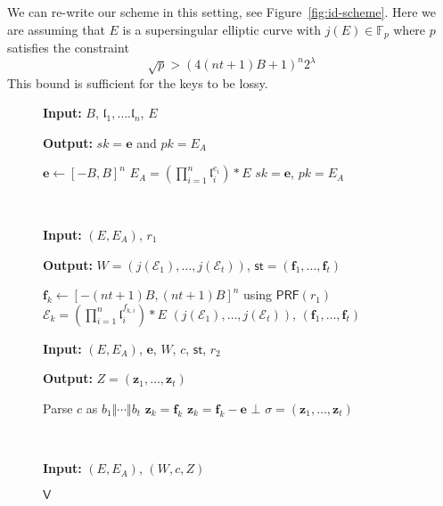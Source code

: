 \documentclass{llncs}
\newcommand{\E}{\mathcal{E}}
\newcommand{\F}{\mathbb{F}}
\renewcommand{\l}{\mathfrak{l}}
\newcommand{\e}{\mathbf{e}}
\newcommand{\f}{\mathbf{f}}
\newcommand{\z}{\mathbf{z}}
\newcommand{\IGen}{\mathsf{IGen}}
\newcommand{\PP}{\mathsf{P}}
\newcommand{\VV}{\mathsf{V}}
\newcommand{\St}{\textsf{st}}
\newcommand{\PRF}{\mathsf{PRF}}
\begin{document}
We can re-write our scheme in this setting, see Figure~\ref{fig:id-scheme}.
Here we are assuming that $E$ is a supersingular elliptic curve with $j(E) \in \F_p$ where $p$ satisfies the constraint
\begin{equation} \label{eq:lossy-p-bound}
  \sqrt{p} > (4(nt+1)B + 1)^{n} 2^\lambda
\end{equation}
This bound is sufficient for the keys to be lossy.


\begin{figure}
\begin{minipage}{.45\textwidth}
\begin{algorithm}[H]
	\caption{$\IGen$}
	\textbf{Input:} $B$, $\l_1, \dots. \l_n$, $E$

	\textbf{Output:} $sk =\e$ and $pk = E_A$

	\begin{algorithmic}[1]
		\State $\e \leftarrow [-B,B]^n$ 
		\State $E_A = ( \prod_{i=1}^n \l_i^{e_i} ) * E$
		\State \Return $sk= \e$, $pk = E_A$
	\end{algorithmic}
\end{algorithm}
\end{minipage}
 \ \ \ \ \ \ \ \ \ \ \ \ 
\begin{minipage}{0.45\textwidth}
\begin{algorithm}[H]
	\caption{$\PP_1$}
	\textbf{Input:} $(E,E_A)$,  $r_1$

	\textbf{Output:} $W = ( j(\E_1) , \dots, j(\E_t) )$, $\St = (\f_1, \dots, \f_t )$

	\begin{algorithmic}[1]
		\State $\f_k \leftarrow [-(nt+1)B,(nt+1)B]^n$ using $\PRF( r_1 )$
		\State $\E_k = ( \prod_{i=1}^n \l_i^{f_{k,i}} ) * E$
		\EndFor
		\State \Return $( j(\E_1) , \dots, j(\E_t) )$, $(\f_1, \dots, \f_t )$
	\end{algorithmic}
\end{algorithm}
\end{minipage}



\begin{minipage}{0.45\textwidth}
\begin{algorithm}[H]
	\caption{$\PP_2$}
	\textbf{Input:} $(E,E_A)$, $\e$, $W$, $c$, $\St$, $r_2$

	\textbf{Output:} $Z = (\z_1, \dots, \z_t)$

	\begin{algorithmic}[1]
		\State Parse $c$ as $b_1 \Vert \cdots \Vert b_t$
		\State $\z_k = \f_k$
		\Else
		\State $\z_k = \f_k - \e$
		\EndIf
		\If{$\z_{k} \not\in [-ntB,ntB]^n$} \State \Return $\bot$ \EndIf
		\EndFor
		\State \Return $\sigma = (\z_1, \dots, \z_t)$
	\end{algorithmic}
\end{algorithm}
\end{minipage}
 \ \ \ \ \ \ \ \ \ \ \ \ 
\begin{minipage}{0.45\textwidth}
\begin{algorithm}[H]
	\caption{$\VV$}
	\textbf{Input:} $(E,E_A)$, $(W,c,Z)$


\end{algorithm}
\end{minipage}
\end{figure}
\end{document}
